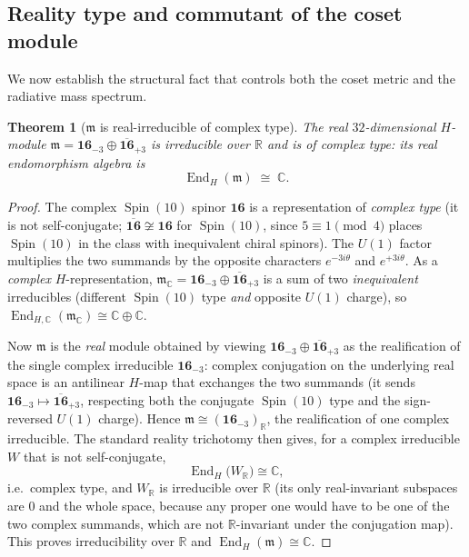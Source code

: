 \documentclass[11pt]{article}
\theoremstyle{plain}
\newtheorem{theorem}{Theorem}[section]
\theoremstyle{definition}
\theoremstyle{remark}
\newcommand{\Spin}{\operatorname{Spin}}
\newcommand{\End}{\operatorname{End}}
\begin{document}
\subsection{Reality type and commutant of the coset module}
\label{sec:app-spectrum:reality}

We now establish the structural fact that controls both the coset metric
and the radiative mass spectrum.

\begin{theorem}[$\mathfrak m$ is real-irreducible of complex type]
\label{thm:app-spectrum:complextype}
The real $32$-dimensional $H$-module
$\mathfrak m=\mathbf{16}_{-3}\oplus\overline{\mathbf{16}}_{+3}$ is
\emph{irreducible over $\mathbb R$} and is of \emph{complex type}: its
real endomorphism algebra is
\[
  \End_H(\mathfrak m)\;\cong\;\mathbb C .
\]
\end{theorem}

\begin{proof}
The complex $\Spin(10)$ spinor $\mathbf{16}$ is a representation of
\emph{complex type} (it is not self-conjugate;
$\overline{\mathbf{16}}\not\cong\mathbf{16}$ for $\Spin(10)$, since
$5\equiv1\pmod 4$ places $\Spin(10)$ in the class with inequivalent chiral
spinors). The $U(1)$ factor multiplies the two summands by the opposite
characters $e^{-3i\theta}$ and $e^{+3i\theta}$. As a \emph{complex}
$H$-representation, $\mathfrak m_{\mathbb C}=\mathbf{16}_{-3}\oplus
\overline{\mathbf{16}}_{+3}$ is a sum of two \emph{inequivalent}
irreducibles (different $\Spin(10)$ type \emph{and} opposite $U(1)$
charge), so $\End_{H,\mathbb C}(\mathfrak m_{\mathbb C})\cong
\mathbb C\oplus\mathbb C$.

Now $\mathfrak m$ is the \emph{real} module obtained by viewing
$\mathbf{16}_{-3}\oplus\overline{\mathbf{16}}_{+3}$ as the realification
of the single complex irreducible $\mathbf{16}_{-3}$: complex conjugation
on the underlying real space is an antilinear $H$-map that exchanges the
two summands (it sends $\mathbf{16}_{-3}\mapsto\overline{\mathbf{16}}_{+3}$,
respecting both the conjugate $\Spin(10)$ type and the sign-reversed
$U(1)$ charge). Hence $\mathfrak m\cong(\mathbf{16}_{-3})_{\mathbb R}$,
the realification of one complex irreducible. The standard reality
trichotomy then gives, for a complex irreducible $W$ that is not
self-conjugate,
\[
  \End_H\bigl(W_{\mathbb R}\bigr)\cong\mathbb C ,
\]
i.e.\ complex type, and $W_{\mathbb R}$ is irreducible over $\mathbb R$
(its only real-invariant subspaces are $0$ and the whole space, because
any proper one would have to be one of the two complex summands, which are
not $\mathbb R$-invariant under the conjugation map). This proves
irreducibility over $\mathbb R$ and $\End_H(\mathfrak m)\cong\mathbb C$.
\end{proof}
\end{document}
